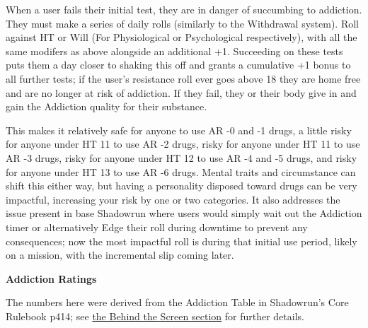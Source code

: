 When a user fails their initial test, they are in danger of succumbing to addiction. They must make a series of daily rolls (similarly to the Withdrawal system). Roll against HT or Will (For Physiological or Psychological respectively), with all the same modifers as above alongside an additional +1. Succeeding on these tests puts them a day closer to shaking this off and grants a cumulative +1 bonus to all further tests; if the user's resistance roll ever goes above 18 they are home free and are no longer at risk of addiction. If they fail, they or their body give in and gain the Addiction quality for their substance.

This makes it relatively safe for anyone to use AR -0 and -1 drugs, a little risky for anyone under HT 11 to use AR -2 drugs, risky for anyone under HT 11 to use AR -3 drugs, risky for anyone under HT 12 to use AR -4 and -5 drugs, and risky for anyone under HT 13 to use AR -6 drugs. Mental traits and circumstance can shift this either way, but having a personality disposed toward drugs can be very impactful, increasing your risk by one or two categories. It also addresses the issue present in base Shadowrun where users would simply wait out the Addiction timer or alternatively Edge their roll during downtime to prevent any consequences; now the most impactful roll is during that initial use period, likely on a mission, with the incremental slip coming later.

\textbf{Addiction Ratings}

The numbers here were derived from the Addiction Table in Shadowrun's Core Rulebook p414; see \hyperref[behind_the_screen]{the Behind the Screen section} for further details.

